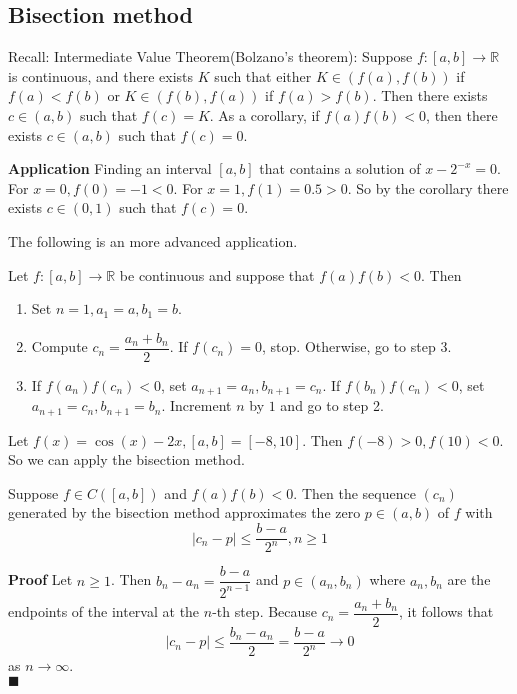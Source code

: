 \documentclass[main.tex]{subfiles}
\begin{document}
\subsection{Bisection method}
\par Recall: Intermediate Value Theorem(Bolzano's theorem): Suppose $f:[a, b] \rightarrow \mathbb{R}$ is continuous, and there exists $K$ such that either $K\in (f(a), f(b))$ if $f(a) < f(b)$ or $K\in (f(b), f(a))$ if $f(a) > f(b)$. Then there exists $c\in (a, b)$ such that $f(c) = K$. As a corollary, if $f(a)f(b)<0$, then there exists $c\in (a, b)$ such that $f(c) = 0$. 
\par \noindent \textbf{Application} Finding an interval $[a, b]$ that contains a solution of $x - 2^{-x} = 0$. For $x = 0, f(0) = -1 < 0$. For $x = 1, f(1) = 0.5 > 0$. So by the corollary there exists $c\in (0, 1)$ such that $f(c) = 0$.
\par The following is an more advanced application. 
\begin{algorithm}
    Let $f:[a, b] \rightarrow \mathbb{R}$ be continuous and suppose that $f(a)f(b) < 0$. Then
    \begin{enumerate}
        \item Set $n = 1, a_1 = a, b_1 = b$.
        \item Compute $c_n = \dfrac{a_n + b_n}{2}$. If $f(c_n) = 0$, stop. Otherwise, go to step 3.
        \item If $f(a_n)f(c_n) < 0$, set $a_{n+1} = a_n, b_{n+1} = c_n$. If $f(b_n)f(c_n) < 0$, set $a_{n+1} = c_n, b_{n+1} = b_n$. Increment $n$ by $1$ and go to step 2.
    \end{enumerate}
\end{algorithm}

\begin{example}
    Let $f(x) = \cos(x) - 2x, [a, b] = [-8, 10]$. Then $f(-8) > 0, f(10) < 0$. So we can apply the bisection method.
\end{example}
\begin{theorem}
    Suppose $f\in C([a, b])$ and $f(a) f(b) < 0$. Then the sequence $(c_n)$ generated by the bisection method approximates the zero $p\in (a, b)$ of $f$ with  
    \begin{equation}
        |c_n - p| \le \dfrac{b - a}{2^{n}}, n \ge 1 
    \end{equation}
\end{theorem}
\par \noindent \textbf{Proof} Let $n \ge 1$. Then $b_n - a_n = \dfrac{b - a}{2^{n-1}}$ and $p\in (a_n, b_n)$ where $a_n, b_n$ are the endpoints of the interval at the $n$-th step. Because $c_n = \dfrac{a_n + b_n}{2}$, it follows that
\begin{equation}
    |c_n - p| \le \dfrac{b_n - a_n}{2} = \dfrac{b - a}{2^n} \to 0  
\end{equation}
as $n\to \infty$. 
\\ \null \hfill $\blacksquare$ 
\end{document}
